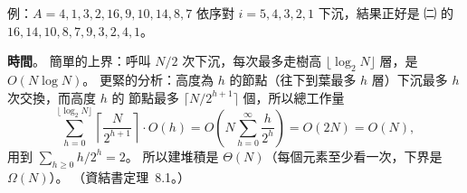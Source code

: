 \begin{pastsoln}
例：$A = 4, 1, 3, 2, 16, 9, 10, 14, 8, 7$ 依序對 $i = 5, 4, 3, 2, 1$ 下沉，結果正好是 ㈡ 的
$16, 14, 10, 8, 7, 9, 3, 2, 4, 1$。

\textbf{時間}。 簡單的上界：呼叫 $N/2$ 次下沉，每次最多走樹高 $\lfloor \log_2 N \rfloor$ 層，是
$O(N \log N)$。 更緊的分析：高度為 $h$ 的節點（往下到葉最多 $h$ 層）下沉最多 $h$ 次交換，而高度 $h$ 的
節點最多 $\lceil N / 2^{h+1} \rceil$ 個，所以總工作量
\[
\sum_{h=0}^{\lfloor \log_2 N \rfloor} \left\lceil \frac{N}{2^{h+1}} \right\rceil \cdot O(h)
= O\!\left( N \sum_{h=0}^{\infty} \frac{h}{2^{h}} \right) = O(2N) = O(N),
\]
用到 $\sum_{h \ge 0} h/2^h = 2$。 所以建堆積是 $\Theta(N)$（每個元素至少看一次，下界是 $\Omega(N)$）。
（資結書定理~8.1。）
\end{pastsoln}
